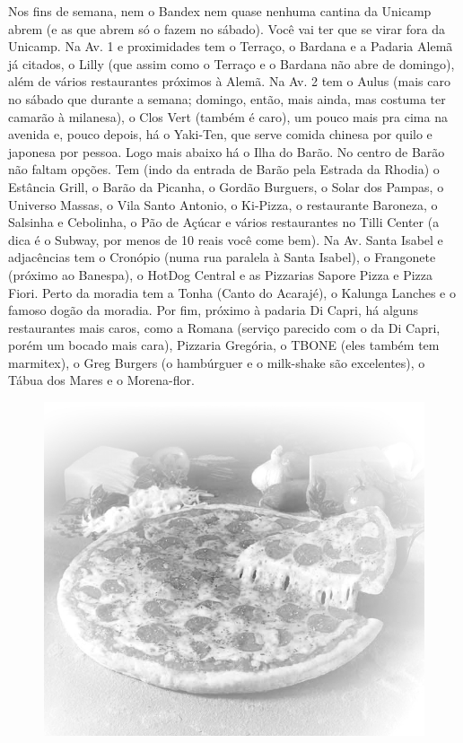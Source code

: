 Nos fins de semana, nem o Bandex nem quase nenhuma cantina da Unicamp abrem (e
as que abrem só o fazem no sábado). Você vai ter que se virar fora da Unicamp.
Na Av. 1 e proximidades tem o Terraço, o Bardana e a Padaria Alemã já citados,
o Lilly (que assim como o Terraço e o Bardana não abre de domingo), além de
vários restaurantes próximos à Alemã. Na Av. 2 tem o Aulus (mais caro no sábado
que durante a semana; domingo, então, mais ainda, mas costuma ter camarão
à milanesa), o Clos Vert (também é caro), um pouco mais pra cima na avenida e,
pouco depois, há o Yaki-Ten, que serve comida chinesa por quilo e japonesa por
pessoa. Logo mais abaixo há o Ilha do Barão. No centro de Barão não faltam
opções. Tem (indo da entrada de Barão pela Estrada da Rhodia) o Estância Grill,
o Barão da Picanha, o Gordão Burguers, o Solar dos Pampas, o Universo Massas,
o Vila Santo Antonio, o Ki-Pizza, o restaurante Baroneza, o Salsinha
e Cebolinha, o Pão de Açúcar e vários restaurantes no Tilli Center (a dica
é o Subway, por menos de 10 reais você come bem). Na Av. Santa Isabel
e adjacências tem o Cronópio (numa rua paralela à Santa Isabel), o Frangonete
(próximo ao Banespa), o HotDog Central e as Pizzarias Sapore Pizza e Pizza
Fiori. Perto da moradia tem a Tonha (Canto do Acarajé), o Kalunga Lanches
e o famoso dogão da moradia. Por fim, próximo à padaria Di Capri, há alguns
restaurantes mais caros, como a Romana (serviço parecido com o da Di Capri,
porém um bocado mais cara), Pizzaria Gregória, o TBONE (eles também tem
marmitex), o Greg Burgers (o hambúrguer e o milk-shake são excelentes), o Tábua
dos Mares e o Morena-flor.
\begin{figure}[h!]
    \centering
    \includegraphics[scale=0.28,keepaspectratio=true]{img/imgs/6-comida/-045.jpg}
\end{figure}


